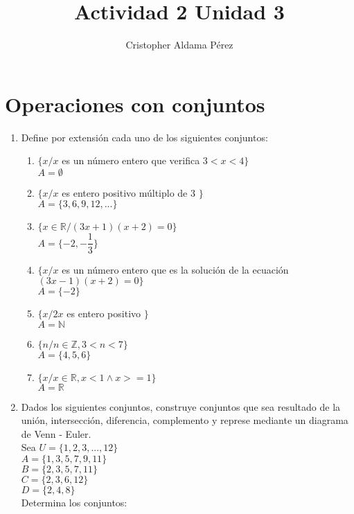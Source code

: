 \documentclass[a4paper,10pt]{article}
\title{Actividad 2 Unidad 3}
\author{Cristopher Aldama Pérez}
\begin{document}
\maketitle

\section{Operaciones con conjuntos}

\begin{enumerate}
 \item Define por extensión cada uno de los siguientes conjuntos:
 \begin{enumerate}[label=(\alph*)]
  \item $ \{ x / x $ es un número entero que verifica $3 < x < 4 \} $
  \\ $ A = \emptyset $
  
  \item $\{ x / x $ es entero positivo múltiplo de 3 $\}$
  \\ $A=\{3, 6, 9, 12, ... \}$
  
  \item $\{x \in \mathbb{R}/ (3x + 1)(x+2) = 0 \}$
  \\ $A=\{-2, -\dfrac{1}{3} \}$
  
  \item $\{x / x$ es un número entero que es la solución de la ecuación $(3x - 1)(x + 2) = 0\}$
  \\ $A=\{-2\}$
  
  \item $\{x/2x$ es entero positivo $\}$
  \\ $A=\mathbb{N}$
  
  \item $\{n/n \in \mathbb{Z}, 3 < n < 7\}$
  \\ $A=\{4, 5, 6\}$
  
  \item $\{x/x \in \mathbb{R}, x < 1 \land x >= 1 \}$
  \\ $A=\mathbb{R}$
 \end{enumerate}
 
 \item Dados los siguientes conjuntos, construye conjuntos que sea resultado de la unión, intersección, diferencia, complemento y represe mediante un diagrama de Venn - Euler.
 \\ Sea $U = \{1, 2, 3, ... , 12\}$
 \\ $A = \{1, 3, 5, 7, 9, 11\}$
 \\ $B = \{2, 3, 5, 7, 11\}$
 \\ $C = \{2, 3, 6, 12\}$
 \\ $D = \{2, 4, 8\}$
 \\ Determina los conjuntos:
 

\end{enumerate}
\end{document}
